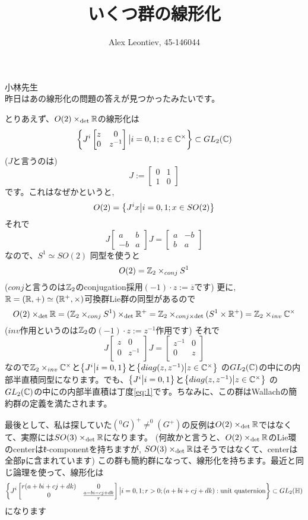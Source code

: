 \documentclass[10pt]{article} %
\author{Alex Leontiev, 45-146044}
\title{いくつ群の線形化}
\begin{document}
\begin{CJK}{UTF8}{min}
\maketitle
小林先生\\

昨日はあの線形化の問題の答えが見つかったみたいです。

とりあえず、$O(2)\times_{\det}\mathbb{R}$の線形化は
\begin{equation}\left\{J^i\begin{bmatrix}z&0\\0&z^{-1}\end{bmatrix}\big| i=0,1; z\in\mathbb{C}^{\times}\right\}\subset GL_2(\mathbb{C})
\label{eq:1}\end{equation}
($J$と言うのは)
\[J:=\begin{bmatrix}0&1\\1&0\end{bmatrix}\]
です。これはなぜかというと,
\[O(2)=\left\{J^ix\big| i=0,1;x\in SO(2)\right\}\]
それで
\[J\begin{bmatrix}a&b\\-b&a\end{bmatrix}J=\begin{bmatrix}a&-b\\b&a\end{bmatrix}\]
なので、$S^1\simeq SO(2)$ 同型を使うと
\[O(2)=\mathbb{Z}_2\times_{conj}S^1\]
($conj$と言うのは$\mathbb{Z}_2$のconjugation採用$(-1)\cdot z:=\overline{z}$です)
更に,$\mathbb{R}=(\mathbb{R},+)\simeq(\mathbb{R}^+,\times)$可換群Lie群の同型があるので
\[O(2)\times_{\det}\mathbb{R}=(\mathbb{Z}_2\times_{conj}S^1)\times_{\det}\mathbb{R}^+=
	\mathbb{Z}_2\times_{conj\times\det}(S^1\times\mathbb{R}^+)
=\mathbb{Z}_2\times_{inv}\mathbb{C}^{\times}\]
($inv$作用というのは$\mathbb{Z}_2$の$(-1)\cdot z:=z^{-1}$作用です)
それで
\[J\begin{bmatrix}z&0\\0&z^{-1}\\\end{bmatrix}J=\begin{bmatrix}z^{-1}&0\\0&z\\\end{bmatrix}\]
なので$\mathbb{Z}_2\times_{inv}\mathbb{C}^{\times}$と$\left\{J^i\big| i=0,1\right\}$と$\left\{diag(z,z^{-1})\big| z\in\mathbb{C}^{\times}\right\}$
の$GL_2(\mathbb{C})$の中にの内部半直積同型になります。でも、$\left\{J^i\big| i=0,1\right\}$と$\left\{diag(z,z^{-1})\big| z\in\mathbb{C}^{\times}\right\}$
の$GL_2(\mathbb{C})$の中にの内部半直積は丁度\ref{eq:1}です。ちなみに、この群はWallachの簡約群の定義を満たされます。

最後として、私は探していた$(^0G)^+\neq^0(G^+)$の反例は$O(2)\times_{\det}\mathbb{R}$ではなくて、実際には$SO(3)\times_{\det}\mathbb{R}$になります。
(何故かと言うと、$O(2)\times_{\det}\mathbb{R}$のLie環のcenterは$\mathfrak{k}$-componentを持ちますが,
$SO(3)\times_{\det}\mathbb{R}$はそうではなくて、centerは全部$\mathfrak{p}$に含まれています)
この群も簡約群になって、線形化を持ちます。最近と同じ論理を使って、線形化は
\[\left\{J^i\begin{bmatrix}r(a+bi+cj+dk)&0\\0&\frac{a-bi-cj+dk}{r}\end{bmatrix}\big| i=0,1; r>0;(a+bi+cj+dk):\mbox{unit quaternion}\right\}
\subset GL_2(\mathbb{H})\]
になります


\end{CJK}
\end{document}

